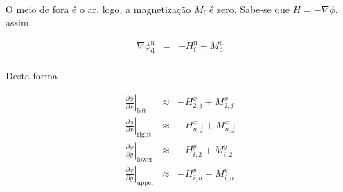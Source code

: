 \documentclass[eletromagnetismo.tex]{subfiles}
\begin{document}
\paragraph{} O meio de fora é o ar, logo, a magnetização $M_{\mathrm{f}}$ é zero. Sabe-se que $H = -\nabla\phi$, assim

\begin{eqnarray}
\nabla\phi_{\mathrm{d}}^{\mathrm{n}} & = & -H_{\mathrm{f}}^{\mathrm{n}} + M_{\mathrm{d}}^{\mathrm{n}}
\end{eqnarray}

\paragraph{} Desta forma

\begin{eqnarray}
\left.\frac{\partial \phi}{\partial x}\right|_{\mathrm{left}}\;\;&\approx&- H^{x}_{2,j} + M^{x}_{2,j}\\
\left.\frac{\partial \phi}{\partial x}\right|_{\mathrm{right}}&\approx&- H^{x}_{n,j} + M^{x}_{n,j}\\
\left.\frac{\partial \phi}{\partial y}\right|_{\mathrm{lower}}&\approx&- H^{y}_{i,2} + M^{y}_{i,2}\\
\left.\frac{\partial \phi}{\partial y}\right|_{\mathrm{upper}}&\approx&- H^{y}_{i,n} + M^{y}_{i,n}
\end{eqnarray}
\end{document}
